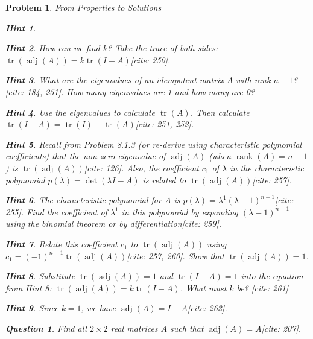 \documentclass[12pt]{article}
\newtheorem{problem}{Problem}[section]
\newtheorem{question}{Question}[problem]
\theoremstyle{definition}
\newtheorem{hint}{Hint}[question]
\newcommand{\adj}{\operatorname{adj}}
\newcommand{\detm}{\operatorname{det}}
\newcommand{\rank}{\operatorname{rank}}
\newcommand{\tr}{\operatorname{tr}}
\begin{document}
\begin{problem}{From Properties to Solutions}
\begin{hint}
        \end{hint}
        \begin{hint}
            How can we find $k$? Take the trace of both sides: $\tr(\adj(A)) = k \tr(I-A)$[cite: 250].
        \end{hint}
        \begin{hint}
            What are the eigenvalues of an idempotent matrix $A$ with rank $n-1$?[cite: 184, 251]. How many eigenvalues are 1 and how many are 0?
        \end{hint}
        \begin{hint}
            Use the eigenvalues to calculate $\tr(A)$. Then calculate $\tr(I-A) = \tr(I) - \tr(A)$[cite: 251, 252].
        \end{hint}
        \begin{hint}
            Recall from Problem 8.1.3 (or re-derive using characteristic polynomial coefficients) that the non-zero eigenvalue of $\adj(A)$ (when $\rank(A)=n-1$) is $\tr(\adj(A))$[cite: 126]. Also, the coefficient $c_1$ of $\lambda$ in the characteristic polynomial $p(\lambda)=\detm(\lambda I - A)$ is related to $\tr(\adj(A))$[cite: 257].
        \end{hint}
        \begin{hint}
            The characteristic polynomial for $A$ is $p(\lambda) = \lambda^1 (\lambda-1)^{n-1}$[cite: 255]. Find the coefficient of $\lambda^1$ in this polynomial by expanding $(\lambda-1)^{n-1}$ using the binomial theorem or by differentiation[cite: 259].
        \end{hint}
        \begin{hint}
            Relate this coefficient $c_1$ to $\tr(\adj(A))$ using $c_1 = (-1)^{n-1} \tr(\adj(A))$[cite: 257, 260]. Show that $\tr(\adj(A)) = 1$.
        \end{hint}
        \begin{hint}
            Substitute $\tr(\adj(A))=1$ and $\tr(I-A)=1$ into the equation from Hint 8: $\tr(\adj(A)) = k \tr(I-A)$. What must $k$ be? [cite: 261]
        \end{hint}
        \begin{hint}
            Since $k=1$, we have $\adj(A) = I-A$[cite: 262].
        \end{hint}
    

    \begin{question} Find all $2 \times 2$ real matrices $A$ such that $\adj(A)=A$[cite: 207].
    \end{question}
     

\end{problem}
\end{document}
